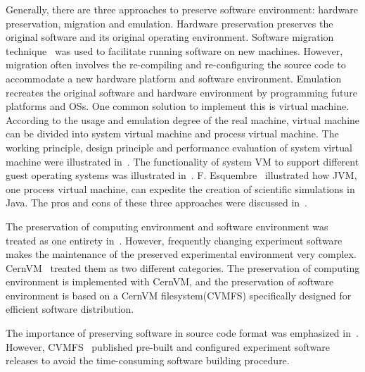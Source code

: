 \documentclass{sig-alternate}
\begin{document}
Generally, there are three approaches to preserve software environment:
hardware preservation, migration and emulation.  Hardware
preservation preserves the original software and its original operating
environment. 
Software migration technique~\cite{cifuentes1996binary,mancl2001refactoring} was used to facilitate running software on new machines.
However, migration often involves the re-compiling and re-configuring
the source code to accommodate a new hardware platform and software environment.
Emulation recreates the original software and hardware environment by
programming future platforms and OSs. One common solution to implement this is
virtual machine. According to the usage and emulation degree of the real
machine, virtual machine can be divided into system virtual machine and process
virtual machine. 
The working principle, design principle and
performance evaluation of system virtual machine were illustrated in~\cite{goldberg1974survey, smith2005architecture}. 
The
functionality of system VM to support different guest operating systems was illustrated in~\cite{barham2003xen,kivity2007kvm,rosenblum1999vmware}.
F. Esquembre~\cite{esquembre2004easy} illustrated how JVM, one process virtual machine, can expedite the creation of
scientific simulations in Java. 
The pros and cons of these three approaches were discussed in~\cite{matthews2009towards,phelps2005no,hong2010software}.

The preservation of computing environment and software environment was treated as one entirety in~\cite{matthews2009towards,phelps2005no,hong2010software}. However, frequently changing experiment software makes the maintenance of the preserved experimental environment very complex. 
CernVM~\cite{buncic2010cernvm} treated them as two different categories. The preservation of computing environment is implemented with CernVM, and the preservation of software environment is based on a CernVM filesystem(CVMFS) specifically designed for efficient software distribution.

The importance of preserving software in source code format was emphasized in~\cite{zabolitzky2002preserving,castagne2013consider}. 
However, CVMFS~\cite{buncic2010cernvm} published pre-built and configured experiment software releases to avoid the time-consuming software building procedure. 
\end{document}
